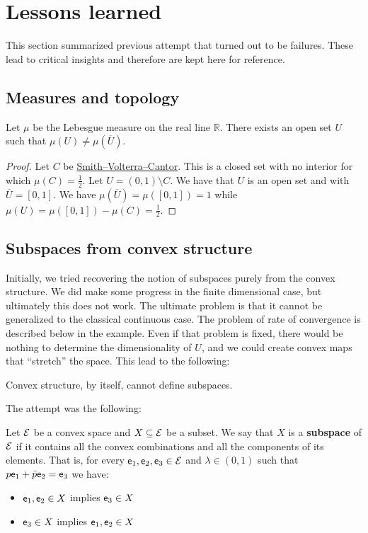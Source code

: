 \section{Lessons learned}

This section summarized previous attempt that turned out to be failures. These lead to critical insights and therefore are kept here for reference.

\subsection{Measures and topology}

\begin{prop}
	Let $\mu$ be the Lebesgue measure on the real line $\mathbb{R}$. There exists an open set $U$ such that $\mu(U) \neq \mu(\overline{U})$.
\end{prop}

\begin{proof}
	Let $C$ be \href{https://en.wikipedia.org/wiki/Smith%E2%80%93Volterra%E2%80%93Cantor_set}{Smith–Volterra–Cantor}. This is a closed set with no interior for which $\mu(C) = \frac{1}{2}$. Let $U = (0,1) \setminus C$. We have that $U$ is an open set and with $\overline{U} = [0,1]$. We have $\mu(\overline{U}) = \mu([0,1]) = 1$ while $\mu(U) = \mu([0,1]) - \mu(C) = \frac{1}{2}$.
\end{proof}

\subsection{Subspaces from convex structure}\label{pm_es_failureConvexSubspace}

Initially, we tried recovering the notion of subspaces purely from the convex structure. We did make some progress in the finite dimensional case, but ultimately this does not work. The ultimate problem is that it cannot be generalized to the classical continuous case. The problem of rate of convergence is described below in the example. Even if that problem is fixed, there would be nothing to determine the dimensionality of $U$, and we could create convex maps that ``stretch'' the space. This lead to the following:
\begin{insight}
	Convex structure, by itself, cannot define subspaces.
\end{insight}

The attempt was the following:

\begin{defn}
	Let $\mathcal{E}$ be a convex space and $X \subseteq \mathcal{E}$ be a subset. We say that $X$ is a \textbf{subspace} of $\mathcal{E}$ if it contains all the convex combinations and all the components of its elements. That is, for every $\mathsf{e}_1, \mathsf{e}_2, \mathsf{e}_3 \in \mathcal{E}$ and $\lambda \in (0,1)$ such that $p \mathsf{e}_1 + \bar{p} \mathsf{e}_2 = \mathsf{e}_3$ we have:
	\begin{itemize}
		\item $\mathsf{e}_1, \mathsf{e}_2 \in X$ implies $\mathsf{e}_3 \in X$
		\item $\mathsf{e}_3 \in X$ implies $\mathsf{e}_1, \mathsf{e}_2 \in X$
	\end{itemize}
\end{defn}

